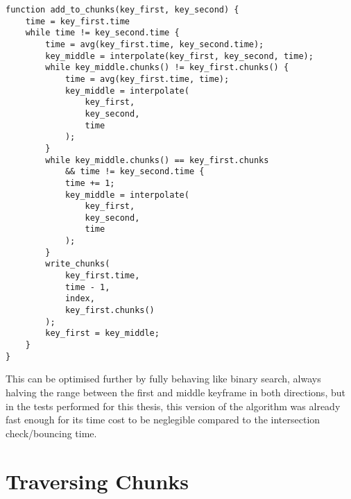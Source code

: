 \begin{lstlisting}[basicstyle=\small, caption={[Final chunk calculation algorithm]Finalised chunk calculation algorithm}, label={lst:finalChunkCalculation}]
function add_to_chunks(key_first, key_second) {
    time = key_first.time
    while time != key_second.time {
        time = avg(key_first.time, key_second.time);
        key_middle = interpolate(key_first, key_second, time);
        while key_middle.chunks() != key_first.chunks() {
            time = avg(key_first.time, time);
            key_middle = interpolate(
                key_first,
                key_second,
                time
            );
        }
        while key_middle.chunks() == key_first.chunks
            && time != key_second.time {
            time += 1;
            key_middle = interpolate(
                key_first,
                key_second,
                time
            );
        }
        write_chunks(
            key_first.time, 
            time - 1, 
            index,
            key_first.chunks()
        );
        key_first = key_middle;
    }
}
\end{lstlisting}

This can be optimised further by fully behaving like binary search,
always halving the range between the first and middle keyframe in both directions,
but in the tests performed for this thesis,
this version of the algorithm was already fast enough for its time cost to be neglegible
compared to the intersection check/bouncing time.

\section{Traversing Chunks}\label{sec:TraversingChunks}

